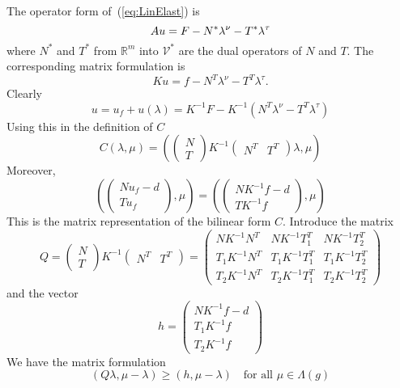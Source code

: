 \documentclass[12pt,a4paper]{article}
\numberwithin{equation}{section}
\numberwithin{table}{section}
\numberwithin{figure}{section}
\newcommand{\R}{\ensuremath{\mathbb{R}}}
\newcommand{\V}{\ensuremath{\mathcal{V}}}
\newcommand{\Kinv}{\ensuremath{K^{-1}}}
\newcommand{\qforall}{\quad\text{for all }}
\begin{document}
The operator form of~(\ref{eq:LinElast}) is
\begin{equation}
  \label{eq:1}
    A u = F - N^* \lambda^\nu - T^* \lambda^\tau \\
\end{equation}
where $N^*$ and $T^*$ from $\R^m$ into $\V^*$ are the dual operators of $N$ and
$T$.  The corresponding matrix formulation is
\begin{equation}
  \label{eq:2}
  K u = f - N^T \lambda^\nu - T^T \lambda^\tau.
\end{equation}
Clearly
\begin{equation}
  \label{eq:51}
  u = u_f + u(\lambda) = K^{-1} F - K^{-1}(N^T \lambda^\nu - T^T \lambda^\tau)
\end{equation}
Using this in the definition of $C$
\begin{equation}
  \label{eq:52}
  C(\lambda, \mu) = (
  \begin{pmatrix}
    N \\ T
  \end{pmatrix}
  K^{-1}
  \begin{pmatrix}
    N^T & T^T
  \end{pmatrix}
  \lambda, \mu)
\end{equation}
Moreover,
\begin{equation}
  \label{eq:53}
    (\begin{pmatrix}
    N u_f - d  \\ T u_f
  \end{pmatrix}
  , \mu) = 
  (\begin{pmatrix}
   N K^{-1} f - d \\
   T K^{-1} f
  \end{pmatrix}
  , \mu)
\end{equation}
This is the matrix representation of the bilinear form $C$.  Introduce the matrix
\begin{equation}
  \label{eq:23}
  Q = 
  \begin{pmatrix}
    N \\ T
  \end{pmatrix}
  \Kinv
  \begin{pmatrix}
    N^T & T^T
  \end{pmatrix}
  =
  \begin{pmatrix}
    N \Kinv N^T & N \Kinv T_1^T & N \Kinv T_2^T \\
    T_1 \Kinv N^T & T_1 \Kinv T_1^T & T_1 \Kinv T_2^T \\
    T_2 \Kinv N^T & T_2 \Kinv T_1^T & T_2 \Kinv T_2^T
  \end{pmatrix}
\end{equation}
and the vector
\begin{equation}
  \label{eq:24}
  h = 
  \begin{pmatrix}
    N\Kinv f - d \\ T_1 \Kinv f \\ T_2 \Kinv f
  \end{pmatrix}
\end{equation}
We have the matrix formulation
\begin{equation}
  \label{eq:22}
  (Q\lambda, \mu-\lambda) \ge (h, \mu-\lambda)\qforall \mu\in\Lambda(g)
\end{equation}
\end{document}
